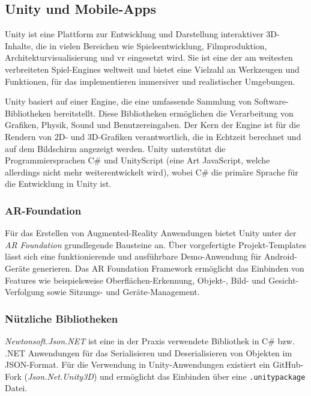 \subsection{Unity und Mobile-Apps}

Unity ist eine Plattform zur Entwicklung und Darstellung interaktiver 3D-Inhalte, die in vielen Bereichen wie Spieleentwicklung, Filmproduktion, Architekturvisualisierung und \ac{vr} eingesetzt wird. Sie ist eine der am weitesten verbreiteten Spiel-Engines weltweit und bietet eine Vielzahl an Werkzeugen und Funktionen, für das implementieren immersiver und realistischer Umgebungen.

Unity basiert auf einer Engine, die eine umfassende Sammlung von Software-Bibliotheken bereitstellt. Diese Bibliotheken ermöglichen die Verarbeitung von Grafiken, Physik, Sound und Benutzereingaben. Der Kern der Engine ist für die Rendern von 2D- und 3D-Grafiken verantwortlich, die in Echtzeit berechnet und auf dem Bildschirm angezeigt werden. Unity unterstützt die Programmiersprachen C\# und UnityScript (eine Art JavaScript, welche allerdings nicht mehr weiterentwickelt wird), wobei C\#  die primäre Sprache für die Entwicklung in Unity ist. \autocite{UnityDocs2024}

\subsubsection{AR-Foundation}

Für das Erstellen von Augmented-Reality Anwendungen bietet Unity unter der \textit{AR Foundation} grundlegende Bausteine an. Über vorgefertigte Projekt-Templates lässt sich eine funktionierende und ausführbare Demo-Anwendung für Android-Geräte generieren. Das AR Foundation Framework ermöglicht das Einbinden von Features wie beispielsweise Oberflächen-Erkennung, Objekt-, Bild- und Gesicht-Verfolgung sowie Sitzungs- und Geräte-Management. \autocite{Unity2024}

\subsubsection{Nützliche Bibliotheken}

\textit{Newtonsoft.Json.NET} ist eine in der Praxis verwendete Bibliothek in C\# bzw. .NET Anwendungen für das Serialisieren und Deserialisieren von Objekten im JSON-Format. Für die Verwendung in Unity-Anwendungen existiert ein GitHub-Fork (\textit{Json.Net.Unity3D}) und ermöglicht das Einbinden über eine \lstinline{.unitypackage} Datei. \autocite{SaladLab2024}

